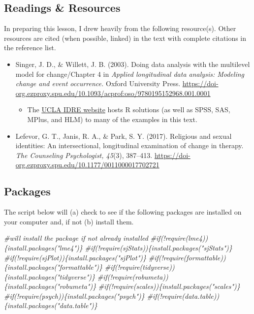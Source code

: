 \documentclass[
  english,
]{book}
\newenvironment{Shaded}{\begin{snugshade}}{\end{snugshade}}
\newcommand{\CommentTok}[1]{\textcolor[rgb]{0.56,0.35,0.01}{\textit{#1}}}
\providecommand{\tightlist}{%
  \setlength{\itemsep}{0pt}\setlength{\parskip}{0pt}}
\begin{document}
\hypertarget{readings-resources-2}{%
\subsection{Readings \& Resources}\label{readings-resources-2}}

In preparing this lesson, I drew heavily from the following resource(s). Other resources are cited (when possible, linked) in the text with complete citations in the reference list.

\begin{itemize}
\tightlist
\item
  Singer, J. D., \& Willett, J. B. (2003). Doing data analysis with the multilevel model for change/Chapter 4 in \emph{Applied longitudinal data analysis: Modeling change and event occurrence.} Oxford University Press. \url{https://doi-org.ezproxy.spu.edu/10.1093/acprof:oso/9780195152968.001.0001}

  \begin{itemize}
  \tightlist
  \item
    The \href{https://stats.idre.ucla.edu/other/examples/alda/}{UCLA IDRE website} hosts R solutions (as well as SPSS, SAS, MPlus, and HLM) to many of the examples in this text.
  \end{itemize}
\item
  Lefevor, G. T., Janis, R. A., \& Park, S. Y. (2017). Religious and sexual identities: An intersectional, longitudinal examination of change in therapy. \emph{The Counseling Psychologist, 45}(3), 387--413. \url{https://doi-org.ezproxy.spu.edu/10.1177/0011000017702721}
\end{itemize}

\hypertarget{packages-3}{%
\subsection{Packages}\label{packages-3}}

The script below will (a) check to see if the following packages are installed on your computer and, if not (b) install them.

\begin{Shaded}
\begin{Highlighting}[]
\CommentTok{\#will install the package if not already installed}
\CommentTok{\#if(!require(lme4))\{install.packages("lme4")\}}
\CommentTok{\#if(!require(sjStats))\{install.packages("sjStats")\}}
\CommentTok{\#if(!require(sjPlot))\{install.packages("sjPlot")\}}
\CommentTok{\#if(!require(formattable))\{install.packages("formattable")\}}
\CommentTok{\#if(!require(tidyverse))\{install.packages("tidyverse")\}}
\CommentTok{\#if(!require(robumeta))\{install.packages("robumeta")\}}
\CommentTok{\#if(!require(scales))\{install.packages("scales")\}}
\CommentTok{\#if(!require(psych))\{install.packages("psych")\}}
\CommentTok{\#if(!require(data.table))\{install.packages("data.table")\}}
\end{Highlighting}
\end{Shaded}
\end{document}
